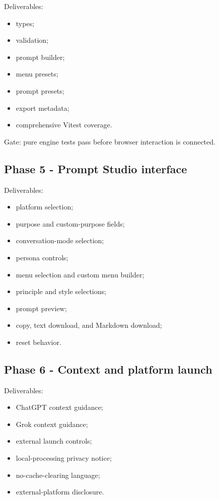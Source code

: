 \documentclass[11pt,letterpaper]{article}
\begin{document}
Deliverables:

\begin{itemize}
    \item types;
    \item validation;
    \item prompt builder;
    \item menu presets;
    \item prompt presets;
    \item export metadata;
    \item comprehensive Vitest coverage.
\end{itemize}

Gate: pure engine tests pass before browser interaction is connected.

\subsection{Phase 5 - Prompt Studio interface}

Deliverables:

\begin{itemize}
    \item platform selection;
    \item purpose and custom-purpose fields;
    \item conversation-mode selection;
    \item persona controls;
    \item menu selection and custom menu builder;
    \item principle and style selections;
    \item prompt preview;
    \item copy, text download, and Markdown download;
    \item reset behavior.
\end{itemize}

\subsection{Phase 6 - Context and platform launch}

Deliverables:

\begin{itemize}
    \item ChatGPT context guidance;
    \item Grok context guidance;
    \item external launch controls;
    \item local-processing privacy notice;
    \item no-cache-clearing language;
    \item external-platform disclosure.
\end{itemize}
\end{document}
